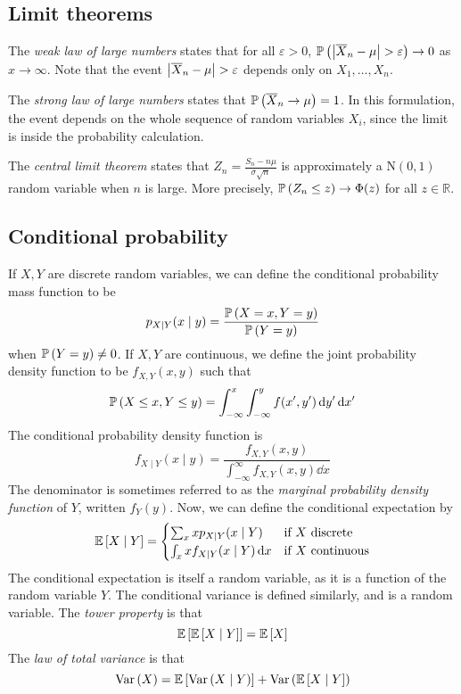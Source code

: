 \subsection{Limit theorems}
The \textit{weak law of large numbers} states that for all \( \varepsilon > 0 \), \( \mathbb{P}\left({\abs{\overline X_n - \mu} > \varepsilon}\right) \to 0 \) as \( x \to \infty \).
Note that the event \( \abs{\overline X_n - \mu} > \varepsilon \) depends only on \( X_1, \dots, X_n \).

The \textit{strong law of large numbers} states that \( \mathbb{P}\left({\overline X_n \to \mu}\right) = 1 \).
In this formulation, the event depends on the whole sequence of random variables \( X_i \), since the limit is inside the probability calculation.

The \textit{central limit theorem} states that \( Z_n = \frac{S_n - n \mu}{\sigma\sqrt{n}} \) is approximately a \( \mathrm{N}(0,1) \) random variable when \( n \) is large.
More precisely, \( \mathbb{P}\left({Z_n \leq z}\right) \to \Phi(z) \) for all \( z \in \mathbb R \).

\subsection{Conditional probability}
If \( X, Y \) are discrete random variables, we can define the conditional probability mass function to be
\[ p_{X \mid Y}(x \mid y) = \frac{\mathbb{P}\left({X = x, Y = y}\right)}{\mathbb{P}\left({Y = y}\right)} \]
when \( \mathbb{P}\left({Y = y}\right) \neq 0 \).
If \( X, Y \) are continuous, we define the joint probability density function to be \( f_{X, Y}(x,y) \) such that
\[ \mathbb{P}\left({X \leq x, Y \leq y}\right) = \int_{-\infty}^x \int_{-\infty}^y f(x',y') \dd{y'}\dd{x'} \]
The conditional probability density function is
\[ f_{X \mid Y}(x \mid y) = \frac{f_{X, Y}(x,y)}{\int_{-\infty}^\infty f_{X,Y}(x,y) \dd{x}} \]
The denominator is sometimes referred to as the \textit{marginal probability density function} of \( Y \), written \( f_Y(y) \).
Now, we can define the conditional expectation by
\[ \mathbb{E}\left[{X \mid Y}\right] = \begin{cases}
	\sum_x x p_{X \mid Y}(x \mid Y) & \text{if } X \text{ discrete} \\
	\int_x x f_{X \mid Y}(x \mid Y) \dd{x} & \text{if } X \text{ continuous}
\end{cases} \]
The conditional expectation is itself a random variable, as it is a function of the random variable \( Y \).
The conditional variance is defined similarly, and is a random variable.
The \textit{tower property} is that
\[ \mathbb{E}\left[{\mathbb{E}\left[{X \mid Y}\right]}\right] = \mathbb{E}\left[{X}\right] \]
The \textit{law of total variance} is that
\[ \operatorname{Var}\left({X}\right) = \mathbb{E}\left[{\operatorname{Var}\left({X \mid Y}\right)}\right] + \operatorname{Var}\left({\mathbb{E}\left[{X \mid Y}\right]}\right) \]

